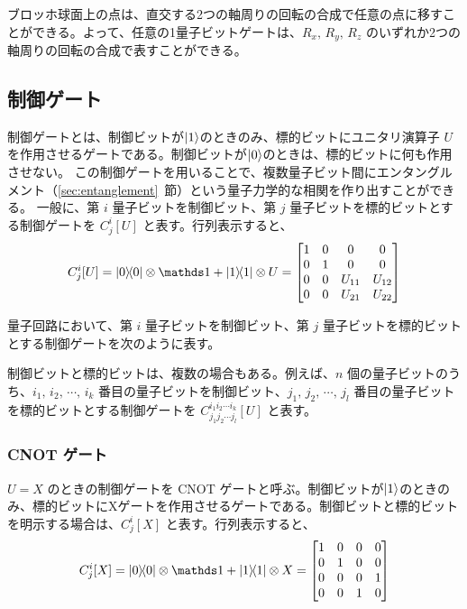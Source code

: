 ブロッホ球面上の点は、直交する2つの軸周りの回転の合成で任意の点に移すことができる。よって、任意の1量子ビットゲートは、$R_x,\,R_y,\,R_z$ のいずれか2つの軸周りの回転の合成で表すことができる。

\subsection{制御ゲート}
制御ゲートとは、制御ビットが$\ket{1}$のときのみ、標的ビットにユニタリ演算子 $U$ を作用させるゲートである。制御ビットが$\ket{0}$のときは、標的ビットに何も作用させない。
この制御ゲートを用いることで、複数量子ビット間にエンタングルメント（\ref{sec:entanglement}~節）という量子力学的な相関を作り出すことができる。
一般に、第 $i$ 量子ビットを制御ビット、第 $j$ 量子ビットを標的ビットとする制御ゲートを $C_j^i[U]$ と表す。行列表示すると、
\begin{align}
    C_j^i[U] = \dyad{0}\ot \bbid + \dyad{1}\ot U
    = \mqty[
        1 & 0 & 0 & 0 \\
        0 & 1 & 0 & 0 \\
        0 & 0 & U_{11} & U_{12}\\
        0 & 0 & U_{21} & U_{22}
        ]
\end{align}

量子回路において、第 $i$ 量子ビットを制御ビット、第 $j$ 量子ビットを標的ビットとする制御ゲートを次のように表す。
\begin{figure}[H]
    \centering
\end{figure}

制御ビットと標的ビットは、複数の場合もある。例えば、$n$ 個の量子ビットのうち、$i_1,\,i_2,\,\cdots,\,i_k$ 番目の量子ビットを制御ビット、$j_1,\,j_2,\,\cdots,\,j_l$ 番目の量子ビットを標的ビットとする制御ゲートを $C_{j_1j_2\cdots j_l}^{i_1i_2\cdots i_k}[U]$ と表す。

\subsubsection{CNOT ゲート}
$U = X$ のときの制御ゲートを CNOT ゲートと呼ぶ。制御ビットが$\ket{1}$のときのみ、標的ビットにXゲートを作用させるゲートである。制御ビットと標的ビットを明示する場合は、$C_j^i[X]$ と表す。行列表示すると、
\begin{align}
    C_j^{i}[X] = \dyad{0}\ot \bbid + \dyad{1}\ot X
    = \mqty[
        1 & 0 & 0 & 0 \\
        0 & 1 & 0 & 0 \\
        0 & 0 & 0 & 1 \\
        0 & 0 & 1 & 0
        ]
\end{align}

